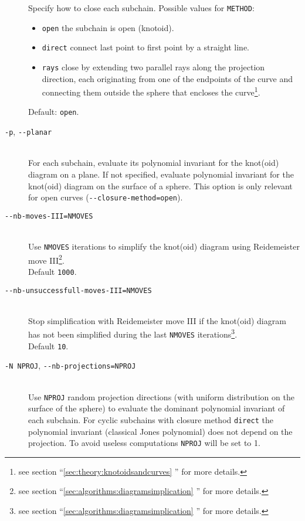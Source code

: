 \begin{description}
  Specify how to close each subchain. Possible values for \lstinline{METHOD}:
  \begin{itemize}
  \item \lstinline{open} the subchain is open (knotoid).
  \item \lstinline{direct} connect last point to first point by a straight line.
  \item \lstinline{rays} close by extending two parallel rays along the projection direction, each originating from one of the endpoints of the curve and connecting them outside the sphere that encloses the curve\footnote{see section ``\ref{sec:theory:knotoidsandcurves} '' for more details.}.
  \end{itemize}
  Default: \lstinline{open}.
\item[\lstinline{-p}, \lstinline{--planar}]\hfill\\
  For each subchain, evaluate its polynomial invariant for the knot(oid) diagram on a plane. If not specified, evaluate polynomial invariant for the knot(oid) diagram on the surface of a sphere. This option is only relevant for open curves (\lstinline{--closure-method=open}).
\item[\lstinline{--nb-moves-III=NMOVES}]\hfill\\
  Use \lstinline{NMOVES} iterations to simplify the knot(oid) diagram using Reidemeister move III\footnote{see section  ``\ref{sec:algorithms:diagramsimplication} '' for more details.}.\\
  Default \lstinline{1000}.
\item[\lstinline{--nb-unsuccessfull-moves-III=NMOVES}]\hfill\\
  Stop simplification with Reidemeister move III if the knot(oid) diagram has not been simplified during the last \lstinline{NMOVES} iterations\footnote{see section  ``\ref{sec:algorithms:diagramsimplication} '' for more details.}.\\
  Default \lstinline{10}.
\item[\lstinline{-N NPROJ}, \lstinline{--nb-projections=NPROJ}]\hfill\\
  Use \lstinline{NPROJ} random projection directions (with uniform distribution on the surface of the sphere) to evaluate the dominant polynomial invariant of each subchain.  For cyclic subchains with closure method \lstinline{direct} the polynomial invariant (classical Jones polynomial) does not depend on the projection. To avoid useless computations \lstinline{NPROJ} will be set to 1.\\

\end{description}
